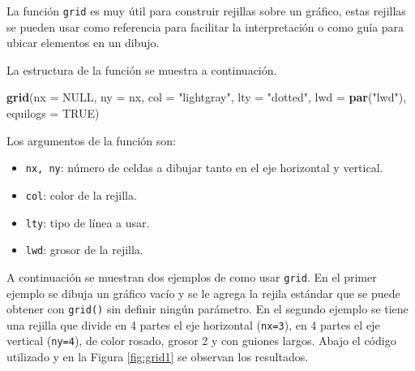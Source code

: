 \documentclass[10pt,]{krantz}
\makeatletter
\newenvironment{Shaded}{\begin{snugshade}}{\end{snugshade}}
\newcommand{\KeywordTok}[1]{\textcolor[rgb]{0.13,0.29,0.53}{\textbf{#1}}}
\newcommand{\DataTypeTok}[1]{\textcolor[rgb]{0.13,0.29,0.53}{#1}}
\newcommand{\StringTok}[1]{\textcolor[rgb]{0.31,0.60,0.02}{#1}}
\newcommand{\OtherTok}[1]{\textcolor[rgb]{0.56,0.35,0.01}{#1}}
\newcommand{\NormalTok}[1]{#1}
\providecommand{\tightlist}{%
  \setlength{\itemsep}{0pt}\setlength{\parskip}{0pt}}
\newenvironment{kframe}{%
\medskip{}
\setlength{\fboxsep}{.8em}
 \def\at@end@of@kframe{}%
 \ifinner\ifhmode%
  \def\at@end@of@kframe{\end{minipage}}%
  \begin{minipage}{\columnwidth}%
 \fi\fi%
 \def\FrameCommand##1{\hskip\@totalleftmargin \hskip-\fboxsep
 \colorbox{shadecolor}{##1}\hskip-\fboxsep
     \hskip-\linewidth \hskip-\@totalleftmargin \hskip\columnwidth}%
 \MakeFramed {\advance\hsize-\width
   \@totalleftmargin\z@ \linewidth\hsize
   \@setminipage}}%
 {\par\unskip\endMakeFramed%
 \at@end@of@kframe}
\renewenvironment{Shaded}{\begin{kframe}}{\end{kframe}}
\makeatother
\begin{document}
La función \texttt{grid} es muy útil para construir rejillas sobre un
gráfico, estas rejillas se pueden usar como referencia para facilitar la
interpretación o como guía para ubicar elementos en un dibujo.

La estructura de la función se muestra a continuación.

\begin{Shaded}
\begin{Highlighting}[]
\KeywordTok{grid}\NormalTok{(}\DataTypeTok{nx =} \OtherTok{NULL}\NormalTok{, }\DataTypeTok{ny =}\NormalTok{ nx, }\DataTypeTok{col =} \StringTok{"lightgray"}\NormalTok{, }\DataTypeTok{lty =} \StringTok{"dotted"}\NormalTok{,}
     \DataTypeTok{lwd =} \KeywordTok{par}\NormalTok{(}\StringTok{"lwd"}\NormalTok{), }\DataTypeTok{equilogs =} \OtherTok{TRUE}\NormalTok{)}
\end{Highlighting}
\end{Shaded}

Los argumentos de la función son:

\begin{itemize}
\tightlist
\item
  \texttt{nx,\ ny}: número de celdas a dibujar tanto en el eje
  horizontal y vertical.
\item
  \texttt{col}: color de la rejilla.
\item
  \texttt{lty}: tipo de línea a usar.
\item
  \texttt{lwd}: grosor de la rejilla.
\end{itemize}

A continuación se muestran dos ejemplos de como usar \texttt{grid}. En
el primer ejemplo se dibuja un gráfico vacío y se le agrega la rejila
estándar que se puede obtener con \texttt{grid()} sin definir ningún
parámetro. En el segundo ejemplo se tiene una rejilla que divide en 4
partes el eje horizontal (\texttt{nx=3}), en 4 partes el eje vertical
(\texttt{ny=4}), de color rosado, grosor 2 y con guiones largos. Abajo
el código utilizado y en la Figura \ref{fig:grid1} se observan los
resultados.
\end{document}
